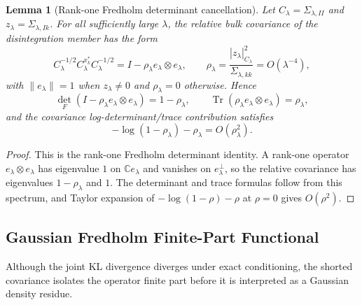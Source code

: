 \documentclass[preprint,12pt]{elsarticle}
\theoremstyle{plain}
\newtheorem{lemma}[theorem]{Lemma}
\theoremstyle{definition}
\theoremstyle{remark}
\newcommand{\tr}{\operatorname{Tr}}
\begin{document}
    \begin{lemma}[Rank-one Fredholm determinant cancellation]
        \label{lem:rank_one_fredholm_cancellation}
        Let $C_\lambda=\Sigma_{\lambda,II}$ and
        $z_\lambda=\Sigma_{\lambda,Ik}$.  For all sufficiently large $\lambda$,
        the relative bulk covariance of the disintegration member has the form
        \begin{equation}
            C_\lambda^{-1/2}C_\lambda^{x_k^*}C_\lambda^{-1/2}
            =
            I-\rho_\lambda e_\lambda\otimes e_\lambda,
            \qquad
            \rho_\lambda
            =
            \frac{|z_\lambda|_{C_\lambda}^2}
                 {\Sigma_{\lambda,kk}}
            =
            O(\lambda^{-4}),
        \end{equation}
        with $\|e_\lambda\|=1$ when $z_\lambda\ne0$ and $\rho_\lambda=0$
        otherwise.  Hence
        \begin{equation}
            \det_{\!F}(I-\rho_\lambda e_\lambda\otimes e_\lambda)
            =
            1-\rho_\lambda,
            \qquad
            \tr(\rho_\lambda e_\lambda\otimes e_\lambda)
            =
            \rho_\lambda,
        \end{equation}
        and the covariance log-determinant/trace contribution satisfies
        \begin{equation}
            -\log(1-\rho_\lambda)-\rho_\lambda
            =
            O(\rho_\lambda^2).
        \end{equation}
    \end{lemma}
    \begin{proof}
        This is the rank-one Fredholm determinant identity.  A rank-one
        operator $e_\lambda\otimes e_\lambda$ has eigenvalue $1$ on
        $\mathbb{C}e_\lambda$ and vanishes on $e_\lambda^\perp$, so the relative
        covariance has eigenvalues $1-\rho_\lambda$ and $1$.  The determinant
        and trace formulas follow from this spectrum, and Taylor expansion of
        $-\log(1-\rho)-\rho$ at $\rho=0$ gives $O(\rho^2)$.
    \end{proof}

    \subsection{Gaussian Fredholm Finite-Part Functional}
    \label{sec:gaussian:functional}

    Although the joint KL divergence diverges under exact conditioning, the
    shorted covariance isolates the operator finite part before it is interpreted
    as a Gaussian density residue.
\end{document}
